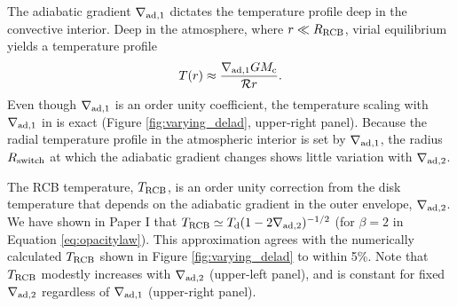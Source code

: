 



The adiabatic gradient $\nabla_{\rm ad,1}$ dictates the temperature profile deep in the convective interior.  Deep in the atmosphere, where $r \ll R_{\rm RCB}$, virial equilibrium yields a temperature profile 
\begin{equation}
\label{eq:Tdeep}
T(r) \approx \frac{\nabla_{\rm ad,1} G M_{\rm c}}{\mathcal{R} r}.
\end{equation}   
Even though $\nabla_{\rm ad,1}$ is an order unity coefficient, the temperature scaling with $\nabla_{\rm ad,1}$ in  is exact (Figure \ref{fig:varying_delad}, upper-right panel). Because the radial temperature profile in the atmospheric interior is set by $\nabla_{\rm ad,1}$, the radius $R_{\rm switch}$ at which the adiabatic gradient changes shows little variation with $\nabla_{\rm ad,2}$. %


The RCB temperature, $T_{\rm RCB}$, is an order unity correction from the disk temperature that depends on the adiabatic gradient in the outer envelope, $\nabla_{\rm ad,2}$.  We have shown in Paper I that $T_{\rm RCB} \simeq T_{\rm d} (1- 2 \nabla_{\rm ad, 2})^{-1/2}$ (for $\beta=2$ in Equation \ref{eq:opacitylaw}). This approximation agrees with the numerically calculated $T_{\rm RCB}$ shown in Figure \ref{fig:varying_delad} to within 5\%. Note that $T_{\rm RCB}$ modestly increases with $\nabla_{\rm ad,2}$ (upper-left panel), and is constant for fixed $\nabla_{\rm ad,2}$  regardless of $\nabla_{\rm ad,1}$ (upper-right panel).

